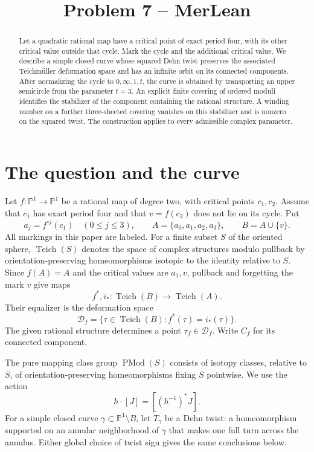 \documentclass[11pt]{article}
\title{Problem 7 -- MerLean}
\author{}
\date{}
\newcommand{\Pone}{\mathbb P^1}
\newcommand{\Teich}{\operatorname{Teich}}
\newcommand{\Mod}{\operatorname{PMod}}
\newcommand{\D}{\mathcal D}
\theoremstyle{remark}
\begin{document}
\maketitle
\begin{abstract}
Let a quadratic rational map have a critical point of exact period four, with its other critical value outside that cycle. Mark the cycle and the additional critical value. We describe a simple closed curve whose squared Dehn twist preserves the associated Teichm\"uller deformation space and has an infinite orbit on its connected components. After normalizing the cycle to $0,\infty,1,t$, the curve is obtained by transporting an upper semicircle from the parameter $t=3$. An explicit finite covering of ordered moduli identifies the stabilizer of the component containing the rational structure. A winding number on a further three-sheeted covering vanishes on this stabilizer and is nonzero on the squared twist. The construction applies to every admissible complex parameter.
\end{abstract}

\section{The question and the curve}
Let $f:\Pone\to\Pone$ be a rational map of degree two, with critical points $c_1,c_2$. Assume that $c_1$ has exact period four and that $v=f(c_2)$ does not lie on its cycle. Put
\[
 a_j=f^{\circ j}(c_1)\quad(0\leq j\leq3),\qquad
 A=\{a_0,a_1,a_2,a_3\},\qquad B=A\cup\{v\}.
\]
All markings in this paper are labeled. For a finite subset $S$ of the oriented sphere, $\Teich(S)$ denotes the space of complex structures modulo pullback by orientation-preserving homeomorphisms isotopic to the identity relative to $S$. Since $f(A)=A$ and the critical values are $a_1,v$, pullback and forgetting the mark $v$ give maps
\[
 f^*,i_*:\Teich(B)\longrightarrow\Teich(A).
\]
Their equalizer is the deformation space
\begin{equation}\label{eq:def}
 \D_f=\{\tau\in\Teich(B):f^*(\tau)=i_*(\tau)\}.
\end{equation}
The given rational structure determines a point $\tau_f\in\D_f$. Write $C_f$ for its connected component.

The pure mapping class group $\Mod(S)$ consists of isotopy classes, relative to $S$, of orientation-preserving homeomorphisms fixing $S$ pointwise. We use the action
\[
 h\cdot[J]=[(h^{-1})^*J].
\]
For a simple closed curve $\gamma\subset\Pone\setminus B$, let $T_\gamma$ be a Dehn twist: a homeomorphism supported on an annular neighborhood of $\gamma$ that makes one full turn across the annulus. Either global choice of twist sign gives the same conclusions below.
\end{document}
